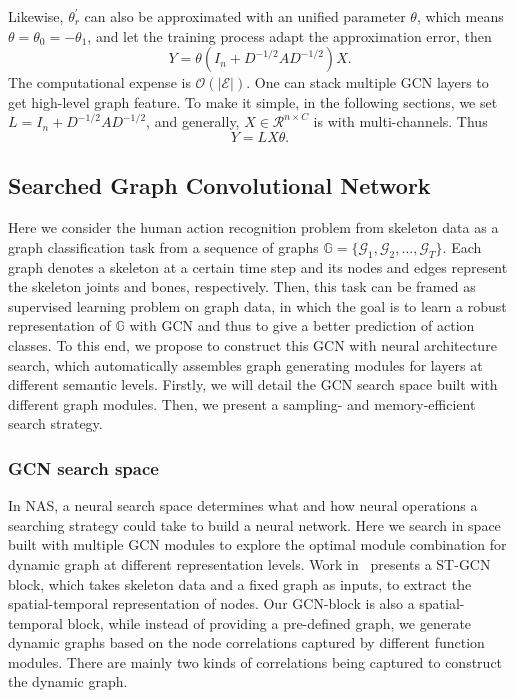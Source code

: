 \documentclass[letterpaper]{article} \usepackage{aaai19}  \usepackage{times}  \usepackage{helvet} \usepackage{courier}  \usepackage[hyphens]{url}  \usepackage{graphicx} \urlstyle{rm} \def\UrlFont{\rm}  \usepackage{graphicx}  \frenchspacing  \setlength{\pdfpagewidth}{8.5in}  \setlength{\pdfpageheight}{11in}
\begin{document}
\noindent Likewise, $\theta_r^{'}$ can also be approximated with an unified parameter $\theta$, which means $\theta = \theta_0 = - \theta_1$, and let the training process adapt the approximation error, then 
\begin{equation}
    Y = \theta(I_n + D^{-1/2}AD^{-1/2})X.
\end{equation}
The computational expense is $\mathcal{O}(|\mathcal{E}|)$. One can stack multiple GCN layers to get high-level graph feature. To make it simple, in the following sections, we set  $ L = I_n + D^{-1/2}AD^{-1/2}$, and generally, $X\in \mathcal{R}^{n\times C}$ is with multi-channels. Thus 
\begin{equation}
    Y = LX\theta.
\end{equation}




\subsection{Searched Graph Convolutional Network}
Here we consider the human action recognition problem from skeleton data as a graph classification task from a sequence of graphs $\mathbb{G} = \{\mathcal{G}_{1}, \mathcal{G}_{2},...,\mathcal{G}_{T}\}$. Each graph denotes a skeleton at a certain time step and its nodes and edges represent the skeleton joints and bones, respectively. Then, this task can be framed as supervised learning problem on graph data, in which the goal is to learn a robust representation of $\mathbb{G}$ with GCN and thus to give a better prediction of action classes. To this end, we propose to construct this GCN with neural architecture search, which automatically assembles graph generating modules for layers at different semantic levels. Firstly, we will detail the GCN search space built with different graph modules. Then, we present a sampling- and memory-efficient search strategy. 



\subsubsection{GCN search space}
In NAS, a neural search space determines what and how neural operations a searching strategy could take to build a neural network. Here we search in space built with multiple GCN modules to explore the optimal module combination for dynamic graph at different representation levels. Work in~\cite{yan2018stgan} presents a ST-GCN block, which takes skeleton data and a fixed graph as inputs, to extract the spatial-temporal representation of nodes. Our GCN-block is also a spatial-temporal block, while instead of providing a pre-defined graph, we generate dynamic graphs based on the node correlations captured by different function modules. There are mainly two kinds of correlations being captured to construct the dynamic graph.
\end{document}
